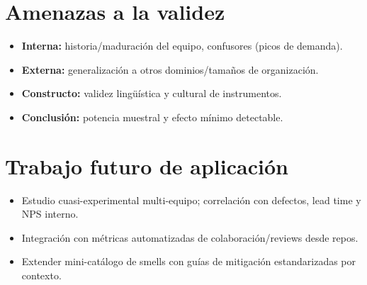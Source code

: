 \section{Amenazas a la validez}
\label{sec:amenazas}
\begin{itemize}[leftmargin=*,nosep]
  \item \textbf{Interna:} historia/maduración del equipo, confusores (picos de demanda).
  \item \textbf{Externa:} generalización a otros dominios/tamaños de organización.
  \item \textbf{Constructo:} validez lingüística y cultural de instrumentos.
  \item \textbf{Conclusión:} potencia muestral y efecto mínimo detectable.
\end{itemize}

\section{Trabajo futuro de aplicación}
\label{sec:trabajo-futuro}
\begin{itemize}[leftmargin=*,nosep]
  \item Estudio cuasi-experimental multi-equipo; correlación con defectos, lead time y NPS interno.
  \item Integración con métricas automatizadas de colaboración/reviews desde repos.
  \item Extender mini-catálogo de smells con guías de mitigación estandarizadas por contexto.
\end{itemize}